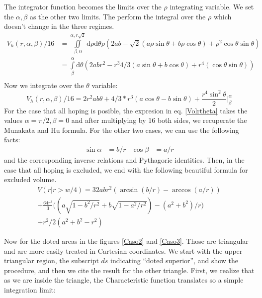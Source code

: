 \documentclass[letterpaper,10pt, jcp, aps]{revtex4-1}
\newcommand{\rd}{\!\mathrm{d}}
\begin{document}
The integrator function becomes the limits over the $\rho$ integrating variable.
We set the $\alpha, \beta$ as the other two limits. The perform the
integral over the $\rho$ which doesn't change in the three regimes.
\begin{equation}
  \begin{split}
 V_h(r,\alpha,\beta)/16 &=\iint\limits_{\beta,0}^{\alpha,r\sqrt{2}} \rd \rho \rd \theta \rho (2ab
-\sqrt{2}(a\rho\sin\theta+b\rho\cos\theta)
+\rho^2 \cos\theta\sin\theta)\\
 &=\int\limits_\beta^{\alpha}  \rd \theta  
(2abr^2 - r^3 4/3 (a\sin\theta+b\cos\theta)+r^4 (\cos\theta\sin\theta))\\
\end{split}
  \end{equation}
Now we integrate over the $\theta$ variable:
\begin{equation}\label{Volrtheta}
  V_h(r,\alpha,\beta)/16 = 2r^2ab\theta+4/3*r^3(a\cos\theta-b\sin\theta)
  +\frac{r^4 \sin^2\theta}{2} \Bigg\vert_\beta^\alpha
\end{equation}
For the case that all hoping is posible, the expresion in eq. \ref{Volrtheta}
takes the values $\alpha=\pi/2, \beta=0$ and after multiplying by 16 both sides,
we recuperate the Munakata and Hu formula. For the other two cases, we can use the following
facts:
\begin{align}
  \sin\alpha&=b/r & \cos\beta&=a/r 
\end{align}
and the corresponding inverse relations and Pythagoric identities.
Then, in the case that all hoping is excluded, we end with the following beautiful
formula for excluded volume.
\begin{multline}\label{VolCaso3}
  V(r \vert r>w/4 )=32abr^2(\arcsin(b/r)-\arccos(a/r))\\
  +\frac{64r^3}{3}\biggl((a\sqrt{1-b^2/r^2}+b\sqrt{1-a^2/r^2})-(a^2+b^2)/r\biggr)\\
  +r^2/2(a^2+b^2-r^2)
\end{multline}

Now for the doted areas in the figures \ref{Caso2} and \ref{Caso3}. Those are triangular
and are more easily treated in Cartesian coordinates. We start with the upper
triangular region, the subscript $ds$ indicating ``doted superior'',
and show the procedure, and then we cite the result for the
other triangle.
First, we realize that as we are inside the triangle, the Characteristic function
translates so a simple integration limit:
\end{document}
